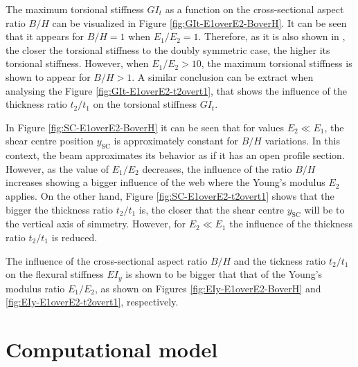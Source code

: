 The maximum torsional stiffness $G I_t$ as a function on the cross-sectional aspect ratio $B/H$ can be visualized in Figure \ref{fig:GIt-E1overE2-BoverH}. It can be seen that it appears for $B/H = 1$ when $E_1/E_2 = 1$. Therefore, as it is also shown in \cite{Raither_basic}, the closer the torsional stiffness to the doubly symmetric case, the higher its torsional stiffness. However, when $E_1/E_2 > 10$, the maximum torsional stiffness is shown to appear for $B/H > 1$. A similar conclusion can be extract when analysing the Figure \ref{fig:GIt-E1overE2-t2overt1}, that shows the influence of the thickness ratio $t_2/t_1$ on the torsional stiffness $G I_t$.

In Figure \ref{fig:SC-E1overE2-BoverH} it can be seen that for values $E_2 \ll E_1$, the shear centre position $y_{\mathrm{SC}}$ is approximately constant for $B/H$ variations. In this context, the beam approximates its behavior as if it has an open profile section. However, as the value of $E_1/E_2$ decreases, the influence of the ratio $B/H$ increases showing a bigger influence of the web where the Young's modulus $E_2$ applies. On the other hand, Figure \ref{fig:SC-E1overE2-t2overt1} shows that the bigger the thickness ratio $t_2/t_1$ is, the closer that the shear centre $y_{\mathrm{SC}}$ will be to the vertical axis of simmetry. However, for $E_2 \ll E_1$ the influence of the thickness ratio $t_2/t_1$ is reduced.

The influence of the cross-sectional aspect ratio $B/H$ and the tickness ratio $t_2/t_1$ on the flexural stiffness $E I_y$ is shown to be bigger that that of the Young's modulus ratio $E_1/E_2$, as shown on Figures \ref{fig:EIy-E1overE2-BoverH} and \ref{fig:EIy-E1overE2-t2overt1}, respectively.




\section{Computational model} \label{sec:computationalModel}

% 